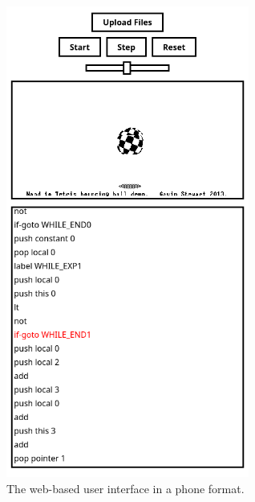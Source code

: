 \begin{center}
  \begin{figure}[ht]
    \centering
    \includegraphics[width=8cm]{fig/ui-demo-mobile.png}
    \caption{The web-based user interface in a phone format.}%
    \label{fig:ui-demo-mobile}
  \end{figure}
\end{center}





